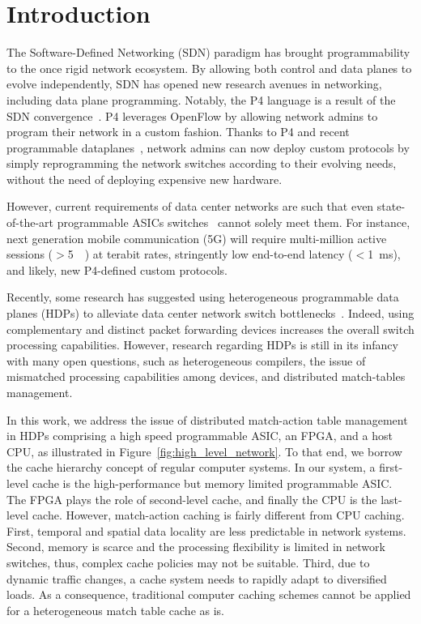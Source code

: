 \section{Introduction}\label{sec:intro}

The Software-Defined Networking (SDN) paradigm has brought programmability to the once rigid network ecosystem.
By allowing both control and data planes to evolve independently, SDN has opened new research avenues in networking, including data plane programming.
Notably, the P4 language is a result of the SDN convergence~\cite{Bosshart:14}.
P4 leverages OpenFlow by allowing network admins to program their network in a custom fashion.
Thanks to P4 and recent programmable dataplanes~\cite{Bosshart:13}, network admins can now deploy custom protocols by simply reprogramming the network switches according to their evolving needs, without the need of deploying expensive new hardware. 

However, current requirements of data center networks are such that even state-of-the-art programmable ASICs switches~\cite{tofino:18} cannot solely meet them.
For instance, next generation mobile communication (5G) will require multi-million active sessions ($>$\SI{5}{\mega\nothing}) at terabit rates, stringently low end-to-end latency ($<$\SI{1}{\milli\second}), and likely, new P4-defined custom protocols.

Recently, some research has suggested using heterogeneous programmable data planes (HDPs) to alleviate data center network switch bottlenecks~\cite{p4eu:18}.
Indeed, using complementary and distinct packet forwarding devices increases the overall switch processing capabilities.
However, research regarding HDPs is still in its infancy with many open questions, such as heterogeneous compilers, the issue of mismatched processing capabilities among devices, and distributed match-tables management.

In this work, we address the issue of distributed match-action table management in HDPs comprising a high speed programmable ASIC, an FPGA, and a host CPU, as illustrated in Figure~\ref{fig:high_level_network}.
To that end, we borrow the cache hierarchy concept of regular computer systems.
In our system, a first-level cache is the high-performance but memory limited programmable ASIC.
The FPGA plays the role of second-level cache, and finally the CPU is the last-level cache.
However, match-action caching is fairly different from CPU caching.
First, temporal and spatial data locality are less predictable in network systems.
Second, memory is scarce and the processing flexibility is limited in network switches, thus, complex cache policies may not be suitable.
Third, due to dynamic traffic changes, a cache system needs to rapidly adapt to diversified loads.
As a consequence, traditional computer caching schemes cannot be applied for a heterogeneous match table cache as is.

